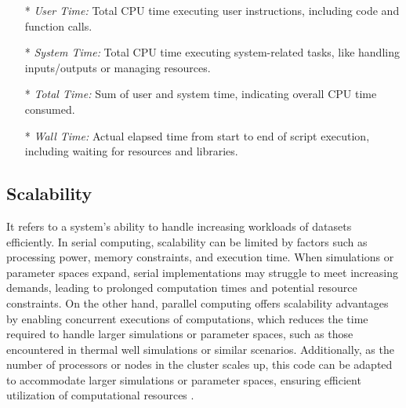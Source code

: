 \documentclass[%
 reprint,
 amsmath,amssymb,
 aps,
]{revtex4-2}
\begin{document}
\begin{itemize}
    \item [*] \textit{User Time:} Total CPU time executing user instructions, including code and function calls.
    \item [*] \textit{System Time:} Total CPU time executing system-related tasks, like handling inputs/outputs or managing resources.
    \item [*] \textit{Total Time:} Sum of user and system time, indicating overall CPU time consumed.
    \item [*] \textit{Wall Time:} Actual elapsed time from start to end of script execution, including waiting for resources and libraries. 
    
\end{itemize}

\subsection{Scalability}
   It refers to a system's ability to handle increasing workloads of datasets efficiently. In serial computing, scalability can be limited by factors such as processing power, memory constraints, and execution time. When simulations or parameter spaces expand, serial implementations may struggle to meet increasing demands, leading to prolonged computation times and potential resource constraints. 
   On the other hand, parallel computing offers scalability advantages by enabling concurrent executions of computations, which reduces the time required to handle larger simulations or parameter spaces, such as those encountered in thermal well simulations or similar scenarios. Additionally, as the number of processors or nodes in the cluster scales up, this code can be adapted to accommodate larger simulations or parameter spaces, ensuring efficient utilization of computational resources 
   \cite{robey_parallel_nodate}   \cite{prasad_scalability_2018}.
\end{document}
